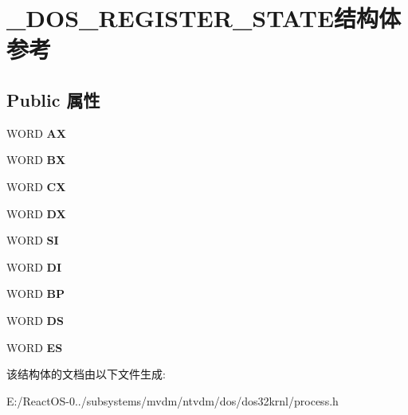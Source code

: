 \hypertarget{struct___d_o_s___r_e_g_i_s_t_e_r___s_t_a_t_e}{}\section{\+\_\+\+D\+O\+S\+\_\+\+R\+E\+G\+I\+S\+T\+E\+R\+\_\+\+S\+T\+A\+T\+E结构体 参考}
\label{struct___d_o_s___r_e_g_i_s_t_e_r___s_t_a_t_e}
\subsection*{Public 属性}
\begin{DoxyCompactItemize}
\item 
\mbox{\label{struct___d_o_s___r_e_g_i_s_t_e_r___s_t_a_t_e_aba007c2e3862acaa9158378b30fe0ba3}} 
W\+O\+RD {\bfseries AX}
\item 
\mbox{\label{struct___d_o_s___r_e_g_i_s_t_e_r___s_t_a_t_e_a09e1f5265d609fd5e9db7ad92c8413dd}} 
W\+O\+RD {\bfseries BX}
\item 
\mbox{\label{struct___d_o_s___r_e_g_i_s_t_e_r___s_t_a_t_e_a01d59ca233b1eb699efa8313968ddd3f}} 
W\+O\+RD {\bfseries CX}
\item 
\mbox{\label{struct___d_o_s___r_e_g_i_s_t_e_r___s_t_a_t_e_a84f13422c5772412ca8f6dd55d547f62}} 
W\+O\+RD {\bfseries DX}
\item 
\mbox{\label{struct___d_o_s___r_e_g_i_s_t_e_r___s_t_a_t_e_acf29d8044ea43458088d864ff959d4ef}} 
W\+O\+RD {\bfseries SI}
\item 
\mbox{\label{struct___d_o_s___r_e_g_i_s_t_e_r___s_t_a_t_e_aaf89bfdc8414dc924b2626feee34c0db}} 
W\+O\+RD {\bfseries DI}
\item 
\mbox{\label{struct___d_o_s___r_e_g_i_s_t_e_r___s_t_a_t_e_af2319c48a5eeabeb72d6d1446d89cc52}} 
W\+O\+RD {\bfseries BP}
\item 
\mbox{\label{struct___d_o_s___r_e_g_i_s_t_e_r___s_t_a_t_e_a84b683c0ae1d382361e77567483a0feb}} 
W\+O\+RD {\bfseries DS}
\item 
\mbox{\label{struct___d_o_s___r_e_g_i_s_t_e_r___s_t_a_t_e_a78d9aa27127de70d2902ea8fbe5cc99c}} 
W\+O\+RD {\bfseries ES}
\end{DoxyCompactItemize}


该结构体的文档由以下文件生成\+:\begin{DoxyCompactItemize}
\item 
E\+:/\+React\+O\+S-\/0../subsystems/mvdm/ntvdm/dos/dos32krnl/process.\+h\end{DoxyCompactItemize}
